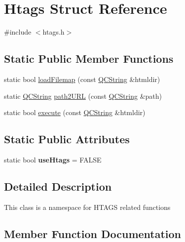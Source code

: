 \hypertarget{struct_htags}{}\section{Htags Struct Reference}
\label{struct_htags}


{\ttfamily \#include $<$htags.\+h$>$}

\subsection*{Static Public Member Functions}
\begin{DoxyCompactItemize}
\item 
static bool \mbox{\hyperlink{struct_htags_a91a5a1322fbff8f8ad136a3372964512}{load\+Filemap}} (const \mbox{\hyperlink{class_q_c_string}{Q\+C\+String}} \&htmldir)
\item 
static \mbox{\hyperlink{class_q_c_string}{Q\+C\+String}} \mbox{\hyperlink{struct_htags_a0ce955dfddd8473bce6373e92532f12e}{path2\+U\+RL}} (const \mbox{\hyperlink{class_q_c_string}{Q\+C\+String}} \&path)
\item 
static bool \mbox{\hyperlink{struct_htags_a459ba4c5a4e6d3308cee25b93448f0cf}{execute}} (const \mbox{\hyperlink{class_q_c_string}{Q\+C\+String}} \&htmldir)
\end{DoxyCompactItemize}
\subsection*{Static Public Attributes}
\begin{DoxyCompactItemize}
\item 
\mbox{\label{struct_htags_af3f32647c4c570264405de97f51cad05}} 
static bool {\bfseries use\+Htags} = F\+A\+L\+SE
\end{DoxyCompactItemize}


\subsection{Detailed Description}
This class is a namespace for H\+T\+A\+GS related functions 

\subsection{Member Function Documentation}
\mbox{\label{struct_htags_a459ba4c5a4e6d3308cee25b93448f0cf}} 
